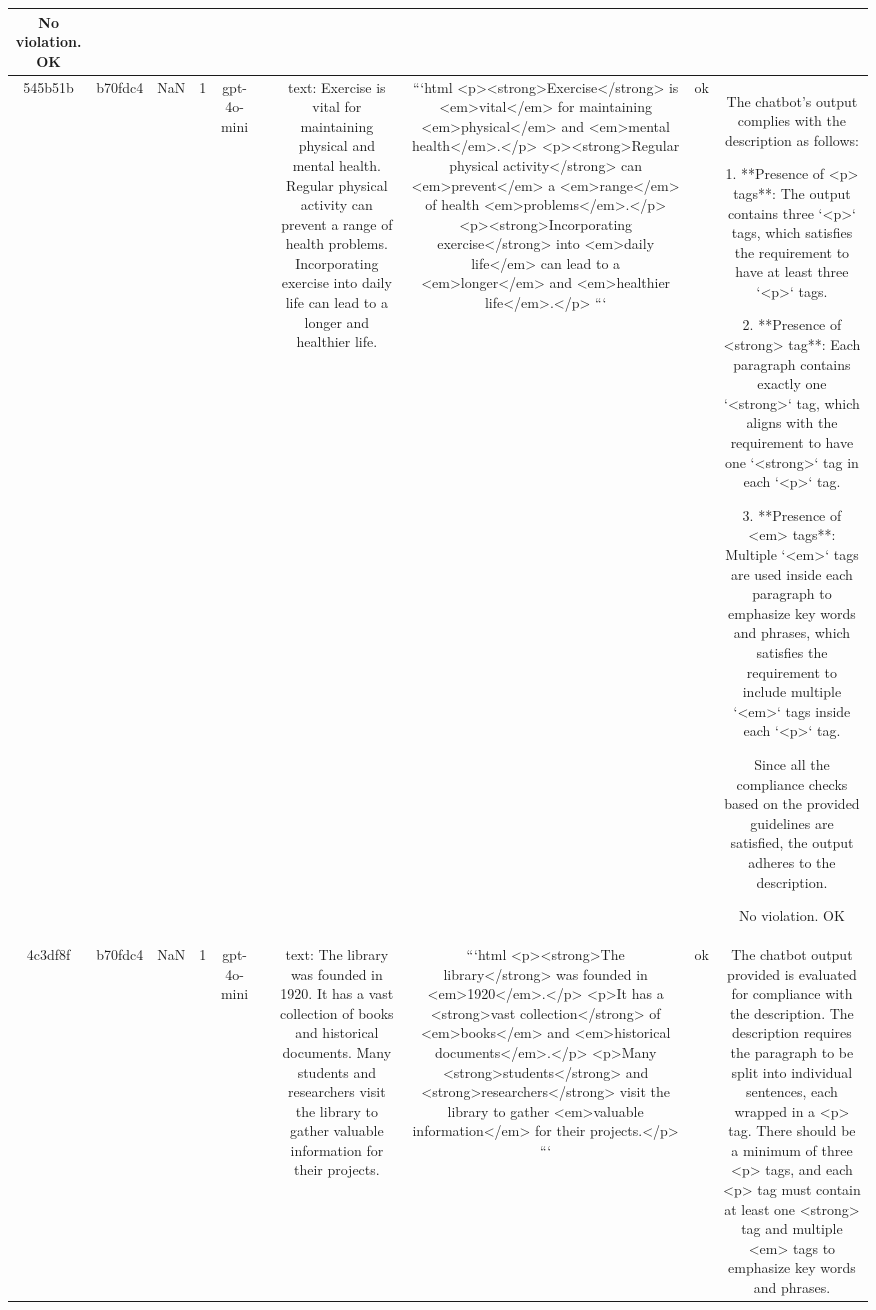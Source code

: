 \begin{table}[h!]
\begin{tabular}{|c|c|c|c|c|c|c|c|c|c|}
No violation.
OK\\
\hline
545b51b & b70fdc4 & NaN & 1 & gpt-4o-mini &  & text: Exercise is vital for maintaining physical and mental health. Regular physical activity can prevent a range of health problems. Incorporating exercise into daily life can lead to a longer and healthier life. & ```html
<p><strong>Exercise</strong> is <em>vital</em> for maintaining <em>physical</em> and <em>mental health</em>.</p>
<p><strong>Regular physical activity</strong> can <em>prevent</em> a <em>range</em> of health <em>problems</em>.</p>
<p><strong>Incorporating exercise</strong> into <em>daily life</em> can lead to a <em>longer</em> and <em>healthier life</em>.</p>
``` & ok & The chatbot's output complies with the description as follows:

1. **Presence of <p> tags**: The output contains three `<p>` tags, which satisfies the requirement to have at least three `<p>` tags.

2. **Presence of <strong> tag**: Each paragraph contains exactly one `<strong>` tag, which aligns with the requirement to have one `<strong>` tag in each `<p>` tag.

3. **Presence of <em> tags**: Multiple `<em>` tags are used inside each paragraph to emphasize key words and phrases, which satisfies the requirement to include multiple `<em>` tags inside each `<p>` tag.

Since all the compliance checks based on the provided guidelines are satisfied, the output adheres to the description.

No violation.
OK\\
\hline
4c3df8f & b70fdc4 & NaN & 1 & gpt-4o-mini &  & text: The library was founded in 1920. It has a vast collection of books and historical documents. Many students and researchers visit the library to gather valuable information for their projects. & ```html
<p><strong>The library</strong> was founded in <em>1920</em>.</p>
<p>It has a <strong>vast collection</strong> of <em>books</em> and <em>historical documents</em>.</p>
<p>Many <strong>students</strong> and <strong>researchers</strong> visit the library to gather <em>valuable information</em> for their projects.</p>
``` & ok & The chatbot output provided is evaluated for compliance with the description. The description requires the paragraph to be split into individual sentences, each wrapped in a <p> tag. There should be a minimum of three <p> tags, and each <p> tag must contain at least one <strong> tag and multiple <em> tags to emphasize key words and phrases.


\end{tabular}
\end{table}
